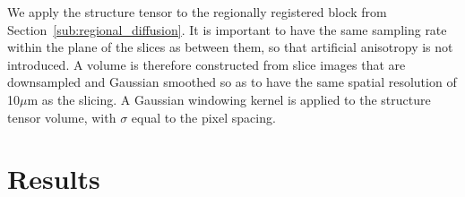   We apply the structure tensor to the regionally registered block from Section~\ref{sub:regional_diffusion}. It is important to have the same sampling rate within the plane of the slices as between them, so that artificial anisotropy is not introduced. A volume is therefore constructed from slice images that are downsampled and Gaussian smoothed so as to have the same spatial resolution of 10$\mu$m as the slicing. A Gaussian windowing kernel is applied to the structure tensor volume, with $\sigma$ equal to the pixel spacing.

\section{Results} %
\label{sec:results}
  \begin{figure}[htbp]
    \centering
    \caption{}
    \label{fig:2D_structure_tensor}
  \end{figure}
  
